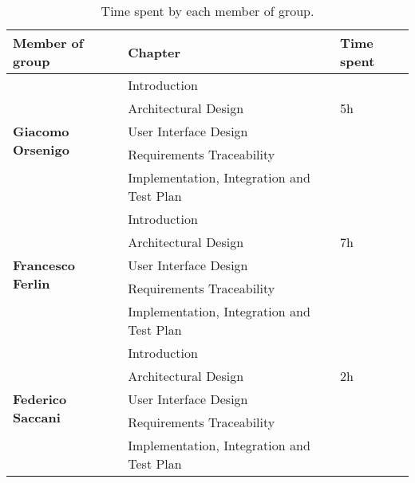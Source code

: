 \begin{table}[H]
    \centering
    \begin{tabular}{|l|l|l|}
        \hline
        \textbf{Member of group }                  & \textbf{Chapter}                          & \textbf{Time spent} \\\hline
        \multirow{5}{*}{\textbf{Giacomo Orsenigo}} & Introduction                              &                     \\
                                                   & Architectural Design                      & 5h                  \\
                                                   & User Interface Design                     &                     \\
                                                   & Requirements Traceability                 &                     \\
                                                   & Implementation, Integration and Test Plan &                     \\\hline
        \multirow{5}{*}{\textbf{Francesco Ferlin}} & Introduction                              &                     \\
                                                   & Architectural Design                      & 7h                  \\
                                                   & User Interface Design                     &                     \\
                                                   & Requirements Traceability                 &                     \\
                                                   & Implementation, Integration and Test Plan &                     \\\hline
        \multirow{5}{*}{\textbf{Federico Saccani}} & Introduction                              &                     \\
                                                   & Architectural Design                      & 2h                  \\
                                                   & User Interface Design                     &                     \\
                                                   & Requirements Traceability                 &                     \\
                                                   & Implementation, Integration and Test Plan &                     \\\hline
    \end{tabular}
    \caption{Time spent by each member of group.}
    \label{table:Time spent}
\end{table}
